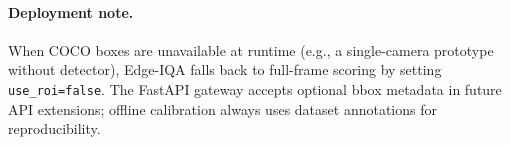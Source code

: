\paragraph{Deployment note.}
When COCO boxes are unavailable at runtime (e.g., a single-camera prototype without detector), Edge-IQA falls back to full-frame scoring by setting \texttt{use\_roi=false}.
The FastAPI gateway accepts optional bbox metadata in future API extensions; offline calibration always uses dataset annotations for reproducibility.

